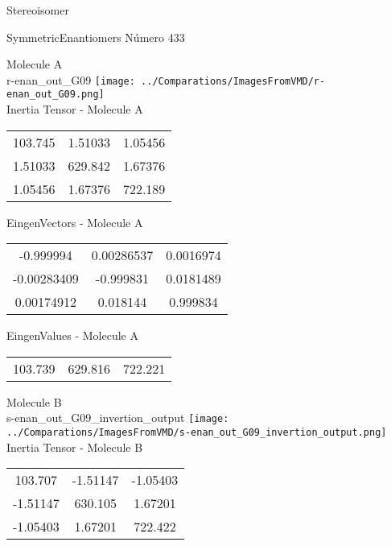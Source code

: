 \begin{center}
\vtab
\vtab
\textcolor{NavyBlue}{\Large Stereoisomer}
\end{center}

 \newpage

\vtab[-2cm]
\begin{center}
{\large SymmetricEnantiomers \tab Número 433}
\end{center}
\begin{multicols}{2}
\begin{center}

Molecule A \\ 
r-enan\_out\_G09
\texttt{[image: ../Comparations/ImagesFromVMD/r-enan\_out\_G09.png]}
\\
Inertia Tensor - Molecule A \\
\vtab

\begin{tabular}{|c c c|}
103.745	 & 	1.51033	 & 	1.05456	 \\
1.51033	 & 	629.842	 & 	1.67376	 \\
1.05456	 & 	1.67376	 & 	722.189
\end{tabular}

\vtab
 EingenVectors - Molecule A     \\
\vtab
\begin{tabular}{|c c c|}
-0.999994	 & 	0.00286537	 & 	0.0016974	 \\
-0.00283409	 & 	-0.999831	 & 	0.0181489	 \\
0.00174912	 & 	0.018144	 & 	0.999834
\end{tabular}

\vtab
 EingenValues - Molecule A     \\
\vtab
\begin{tabular}{|c c c|}
103.739	 & 	629.816	 & 	722.221	 \\
\end{tabular}
\columnbreak

Molecule B \\ 
s-enan\_out\_G09\_invertion\_output
\texttt{[image: ../Comparations/ImagesFromVMD/s-enan\_out\_G09\_invertion\_output.png]}
\\
Inertia Tensor - Molecule B \\
\vtab

\begin{tabular}{|c c c|}
103.707	 & 	-1.51147	 & 	-1.05403	 \\
-1.51147	 & 	630.105	 & 	1.67201	 \\
-1.05403	 & 	1.67201	 & 	722.422
\end{tabular}


\end{center}
\end{multicols}
